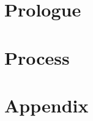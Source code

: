
\part{Prologue} %







\cleardoublepage %


\part{Process} %







\part{Appendix} %

\appendix

